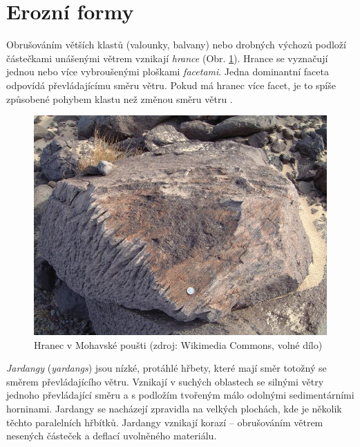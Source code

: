 %

\section{Erozní formy}
Obrušováním větších klastů (valounky, balvany) nebo drobných výchozů podloží částečkami unášenými větrem vznikají \emph{hrance} (Obr. \ref{fig:hranec}). Hrance se vyznačují jednou nebo více vybroušenými ploškami \emph{facetami}. Jedna dominantní faceta odpovídá převládajícímu směru větru. Pokud má hranec více facet, je to spíše způsobené pohybem klastu než změnou směru větru \parencite{livingstoneAeolianGeomorphologyNew2019}.
\begin{figure}
	\centering
	\includegraphics[width=1\linewidth]{obrazky/eolicka/ventifact_mojave}
	\caption{Hranec v Mohavské poušti (zdroj: Wikimedia Commons, volné dílo)}
	\label{fig:hranec}
\end{figure}

\emph{Jardangy} (\textit{yardangs}) jsou nízké, protáhlé hřbety, které mají směr totožný se směrem převládajícího větru. Vznikají v suchých oblastech se silnými větry jednoho převládající směru a s podložím tvořeným málo odolnými sedimentárními horninami. Jardangy se nacházejí zpravidla na velkých plochách, kde je několik těchto paralelních hřbítků. Jardangy vznikají korazí -- obrušováním větrem nesených částeček a deflací uvolněného materiálu. 


